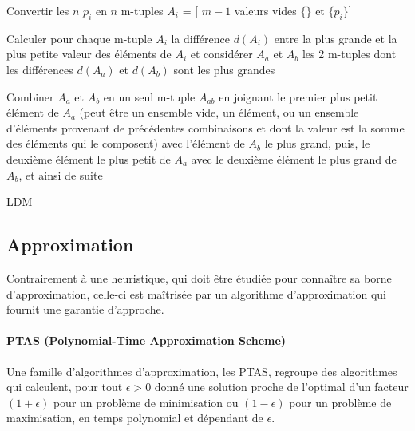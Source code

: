 \documentclass[a4paper,12pt]{report}
\theoremstyle{plain}				%
\theoremstyle{definition}				%
\begin{document}
\bigskip  
\begin{algorithm}[H]
\DontPrintSemicolon
{}

\BlankLine %
Convertir les $n$ $p_i$ en $n$ m-tuples $A_i$ = [ $m-1$ valeurs vides $\{\}$ et $\{p_i\}$]

{
Calculer pour chaque m-tuple $A_i$ la différence $d(A_i)$ 
  entre la plus grande et la plus petite valeur des éléments de $A_i$ et
  considérer $A_a$ et $A_b$ les 2 m-tuples dont les différences 
  $d(A_a)$ et $d(A_b)$ sont les plus grandes

Combiner $A_a$ et $A_b$ en un seul m-tuple $A_{ab}$ en joignant 
  le premier plus petit élément de $A_a$ 
  (peut être un ensemble vide, 
  un élément, 
  ou un ensemble d'éléments provenant de précédentes combinaisons et 
  dont la valeur est la somme des éléments qui le composent)
  avec l'élément de $A_b$ le plus grand, 
  puis,
  le deuxième élément le plus petit de $A_a$ avec le deuxième élément le plus grand de $A_b$,
  et ainsi de suite 
}

\caption{LDM}
\label{algo:LDM}
\end{algorithm}

\subsection{Approximation}\label{ssec:Approximation}
Contrairement à une heuristique, qui doit être étudiée pour connaître sa borne d'approximation, 
  celle-ci est maîtrisée par un algorithme d'approximation qui fournit une garantie d'approche.

\paragraph{PTAS (Polynomial-Time Approximation Scheme)}
Une famille d'algorithmes d'approximation, les PTAS,   
  regroupe des algorithmes qui calculent, pour tout $\epsilon > 0$ donné 
  une solution proche de l'optimal 
  d'un facteur $(1 + \epsilon)$ pour un problème de minimisation 
  ou $(1 - \epsilon)$ pour un problème de maximisation, 
  en temps polynomial et dépendant de $\epsilon$. 
\end{document}
